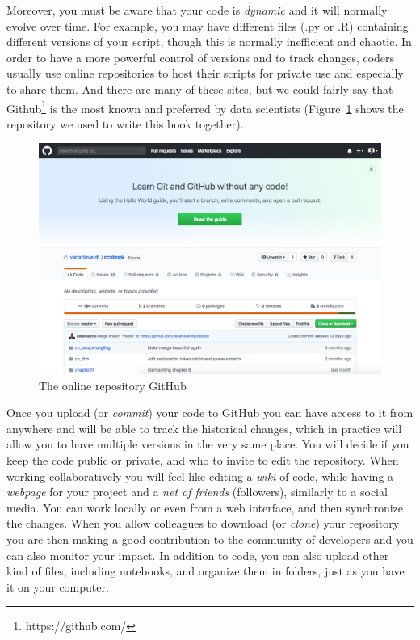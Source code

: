 Moreover, you must be aware that your code is \textit{dynamic} and it will normally evolve over time. For example, you may have different files (.py or .R) containing different versions of your script, though this is normally inefficient and chaotic. In order to have a more powerful control of versions and to track changes, coders usually use online repositories to host their scripts for private use and especially to share them. And there are many of these sites, but we could fairly say that Github\footnote{https://github.com/} is the most known and preferred by data scientists (Figure~\ref{fig:github} shows the repository we used to write this book together).

\begin{figure}
\centering
\includegraphics[width=0.9\linewidth]{figures/ch04_github}
\caption{The online repository GitHub}
\label{fig:github}
\end{figure}
 
Once you upload (or \textit{commit}) your code to GitHub you can have access to it from anywhere and will be able to track the historical changes, which in practice will allow you to have multiple versions in the very same place. You will decide if you keep the code public or private, and who to invite to edit the repository. When working collaboratively you will feel like editing a \textit{wiki} of code, while having a \textit{webpage} for your project and a \textit{net of friends} (followers), similarly to a social media. You can work locally or even from a web interface, and then synchronize the changes. When you allow colleagues to download (or \textit{clone}) your repository you are then making a good contribution to the community of developers and you can also monitor your impact. In addition to code, you can also upload other kind of files, including notebooks, and organize them in folders, just as you have it on your computer.

